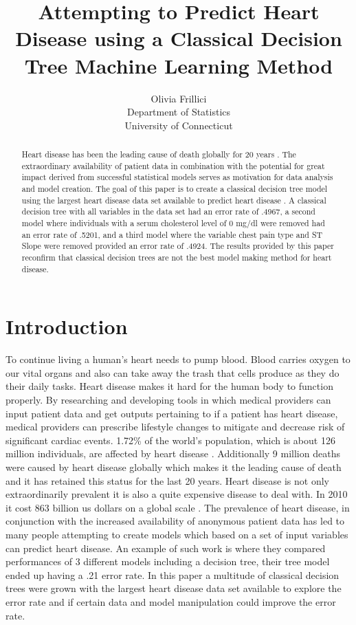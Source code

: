 \documentclass[12pt]{article}
\title{Attempting to Predict Heart Disease using a Classical Decision Tree Machine Learning Method }
\author{Olivia Frillici\\
  Department of Statistics\\
  University of Connecticut
}
\begin{document}
\maketitle
\begin{abstract}
  Heart disease has been the leading cause of death globally for 20 years \citep*{khan2020global}. The extraordinary availability of patient data in combination with the potential for great impact derived from successful statistical models serves as motivation for data analysis and model creation. The goal of this paper is to create a classical decision tree model using the largest heart disease data set available to predict heart disease \citep*{CitekeyMisc}. A classical decision tree with all variables in the data set had an error rate of .4967, a second model where individuals with a serum cholesterol level of 0 mg/dl were removed had an error rate of .5201, and a third model where the variable chest pain type and ST Slope were removed provided an error rate of .4924. The results provided by this paper reconfirm that classical decision trees are not the best model making method for heart disease. 
    \end{abstract}
  \newpage  
    
    \section{Introduction}
    \label{sec:intro}
    
    To continue living a human’s heart needs to pump blood. Blood carries oxygen to our vital organs and also can take away the trash that cells produce as they do their daily tasks. Heart disease makes it hard for the human body to function properly. By researching and developing tools in which medical providers can input patient data and get outputs pertaining to if a patient has heart disease, medical providers can prescribe lifestyle changes to mitigate and decrease risk of significant cardiac events. 
1.72\% of the world’s population, which is about 126 million individuals, are affected by heart disease \citep{khan2020global}. Additionally 9 million deaths were caused by heart disease globally which makes it the leading cause of death and it has retained this status for the last 20 years\citep{khan2020global}. Heart disease is not only extraordinarily prevalent it is also a quite expensive disease to deal with. In 2010 it cost 863 billion us dollars on a global scale \citep{khan2020global}. 
The prevalence of heart disease, in conjunction with the increased availability of anonymous patient data has led to many people attempting to create models which based on a set of input variables can predict heart disease. An example of such work is \citet{5643666} where they compared performances of 3 different models including a decision tree, their tree model ended up having a .21 error rate. 
In this paper a multitude of classical decision trees were grown with the largest heart disease data set available to explore the error rate and if certain data and model manipulation could improve the error rate.
\end{document}
